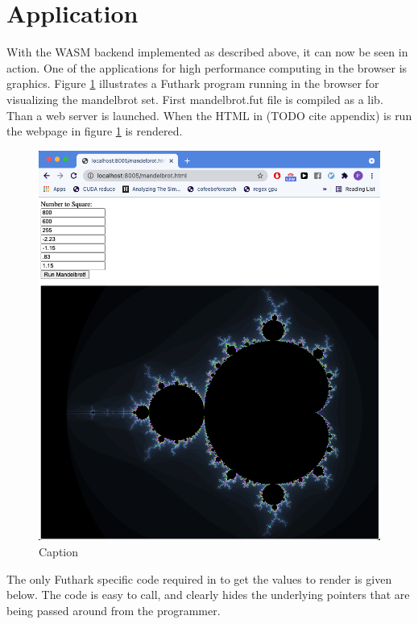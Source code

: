 \documentclass[11pt]{book}
\begin{document}
\section{Application}

With the WASM backend implemented as described above, it can now be seen in action. One of the applications for high performance computing in the browser is graphics. Figure \ref{fig:mandelbrot} illustrates a Futhark program running in the browser for visualizing the mandelbrot set. First mandelbrot.fut file is compiled as a lib. Than a web server is launched. When the HTML in (TODO cite appendix) is run the webpage in figure \ref{fig:mandelbrot} is rendered.



\begin{figure}[htbp]
    \centering
    \includegraphics[scale=0.2]{figures/mandelbrot.png}
    \caption{Caption}
    \label{fig:mandelbrot}
\end{figure}

The only Futhark specific code required in to get the values to render is given below. The code is easy to call, and clearly hides the underlying pointers that are being passed around from the programmer.
\end{document}
